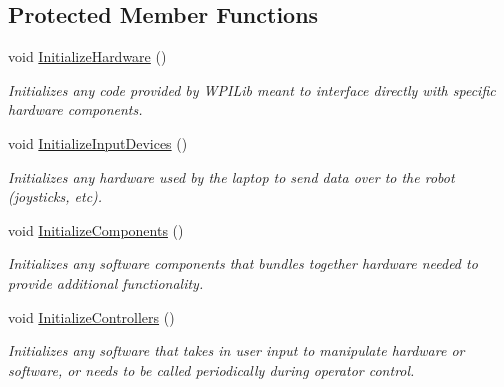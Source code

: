 \subsection*{\-Protected \-Member \-Functions}
\begin{DoxyCompactItemize}
\item 
void \hyperlink{class_main_robot_ad678a5f6033e2d299e2d83d4b0c9d055}{\-Initialize\-Hardware} ()
\begin{DoxyCompactList}\small\item\em \-Initializes any code provided by \-W\-P\-I\-Lib meant to interface directly with specific hardware components. \end{DoxyCompactList}\item 
void \hyperlink{class_main_robot_a4a88b614c4ed0bae3e9ae26dd81100a7}{\-Initialize\-Input\-Devices} ()
\begin{DoxyCompactList}\small\item\em \-Initializes any hardware used by the laptop to send data over to the robot (joysticks, etc). \end{DoxyCompactList}\item 
void \hyperlink{class_main_robot_a1f80d64a6b9eef342f589eb953c74341}{\-Initialize\-Components} ()
\begin{DoxyCompactList}\small\item\em \-Initializes any software components that bundles together hardware needed to provide additional functionality. \end{DoxyCompactList}\item 
void \hyperlink{class_main_robot_aea7bedc178f428c048ba5b307dd3b354}{\-Initialize\-Controllers} ()
\begin{DoxyCompactList}\small\item\em \-Initializes any software that takes in user input to manipulate hardware or software, or needs to be called periodically during operator control. \end{DoxyCompactList}\end{DoxyCompactItemize}
